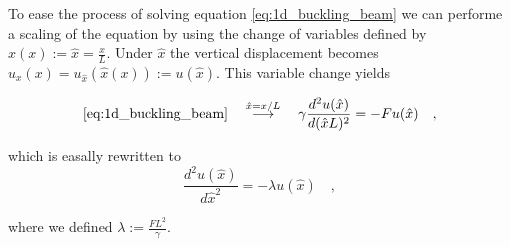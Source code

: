 \documentclass[final, 3p, times, 11.5pt]{article}
\begin{document}
To ease the process of solving equation \eqref{eq:1d_buckling_beam} we can performe a scaling of the equation by using the change of variables defined by $\hat x (x) := \hat x = \frac{x}{L}$. Under $\hat x$ the vertical displacement becomes $u_x(x) = u_{\hat x}(\hat x(x)):=u(\hat x)$. This variable change yields

\begin{equation*}
\eqref{eq:1d_buckling_beam}\quad \stackrel{\hat x = x/L}{\longrightarrow} \quad
    \gamma \frac{d^{2} u(\hat x)}{d (\hat x L)^{2}} = - F u(\hat x) \quad, 
\end{equation*}

which is easally rewritten to 
\begin{equation}\label{eq:1d_buckling_beam_scaled}
    \frac{d^{2} u(\hat x)}{d \hat x^{2}} = - \lambda u(\hat{x})  \quad ,
\end{equation}

where we defined $\lambda := \frac{FL^{2}}{\gamma}$. 
\end{document}

